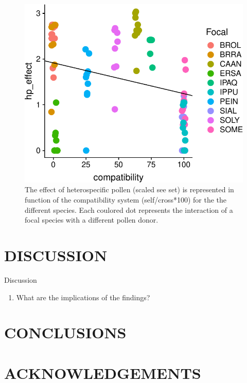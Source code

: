 \documentclass[11pt,a4paper]{article}
\providecommand{\tightlist}{%
  \setlength{\itemsep}{0pt}\setlength{\parskip}{0pt}}
\begin{document}
\begin{figure}
\centering
\includegraphics{output/figures/unnamed-chunk-3-1.pdf}
\caption{The effect of heterospecific pollen (scaled see set) is
represented in function of the compatibility system (self/cross*100) for
the the different species. Each coulored dot represents the interaction
of a focal species with a different pollen donor.}
\end{figure}

\newpage

\section{DISCUSSION}\label{discussion}

Discussion

\begin{enumerate}
\def\labelenumi{\arabic{enumi}.}
\tightlist
\item
  What are the implications of the findings?
\end{enumerate}

\section{CONCLUSIONS}\label{conclusions}

\section{ACKNOWLEDGEMENTS}\label{acknowledgements}
\end{document}

